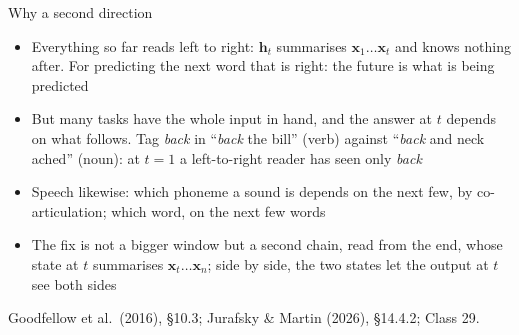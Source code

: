 \documentclass[aspectratio=169, 11pt]{beamer}
\newcommand{\srcline}[1]{%
  \par\vspace{0.25em}%
  {\scriptsize\color{mcMuted}\hfill #1\par}}
\newcommand{\src}[3]{}      %
\begin{document}
\begin{frame}{Why a second direction}
  \src{goodfellow2016}{section}{10.3}
  \src{jurafsky_slp3}{section}{14.4.2}
  \vspace{0.05em}
  {\footnotesize
  \begin{itemize}\itemsep0.25em
    \item Everything so far reads \alert{left to right}: $\mathbf{h}_t$
          summarises $\mathbf{x}_1 \ldots \mathbf{x}_t$ and knows nothing after.
          For predicting the next word that is right: the future is what
          is being predicted
    \item But many tasks have the \alert{whole input in hand}, and the
          answer at $t$ depends on what follows. Tag \emph{back} in
          ``\emph{back} the bill'' (verb) against ``\emph{back} and neck
          ached'' (noun): at $t = 1$ a left-to-right reader has seen only
          \emph{back}
    \item Speech likewise: which phoneme a sound is depends on the next
          few, by co-articulation; which word, on the next few words
    \item The fix is not a bigger window but a \alert{second chain}, read
          from the end, whose state at $t$ summarises $\mathbf{x}_t \ldots \mathbf{x}_n$;
          side by side, the two states let the output at $t$ see both sides
  \end{itemize}}
  \srcline{Goodfellow et al.\ (2016), \S10.3; Jurafsky \& Martin (2026), \S14.4.2; Class 29.}
\end{frame}
\end{document}
